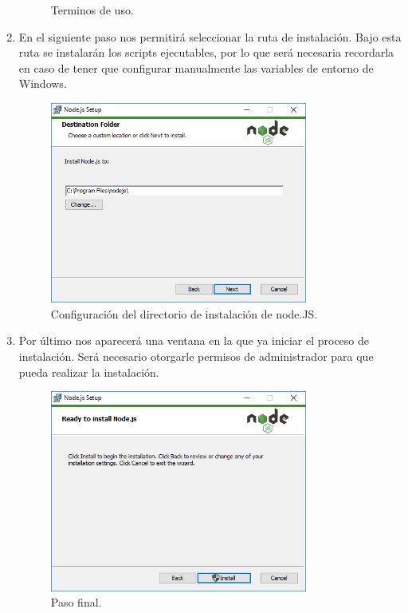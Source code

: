 \begin{enumerate}
\begin{figure}[H]
  \caption{Terminos de uso.}
\end{figure}
\item En el siguiente paso nos permitirá seleccionar la ruta de instalación. Bajo esta ruta se instalarán los scripts ejecutables, por lo que será necesaria recordarla en caso de tener que configurar manualmente las variables de entorno de Windows.
\begin{figure}[H]
\centering
  \includegraphics[width=0.8\textwidth]{Figures/anexo/anexoI/nodejs/3}
  \caption{Configuración del directorio de instalación de node.JS.}
\end{figure}
\item Por último nos aparecerá una ventana en la que ya iniciar el proceso de instalación. Será necesario otorgarle permisos de administrador para que pueda realizar la instalación.
\begin{figure}[H]
\centering
  \includegraphics[width=0.8\textwidth]{Figures/anexo/anexoI/nodejs/4}
  \caption{Paso final.}
\end{figure}
\end{enumerate}

